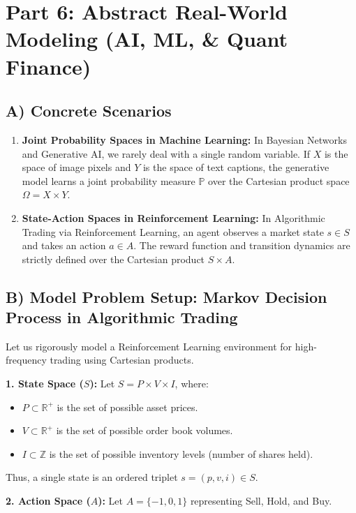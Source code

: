 \documentclass[11pt]{article}
\newcommand{\R}{\mathbb{R}}
\newcommand{\Z}{\mathbb{Z}}
\begin{document}
\section{Part 6: Abstract Real-World Modeling (AI, ML, \& Quant Finance)}

\subsection{A) Concrete Scenarios}
\begin{enumerate}
    \item \textbf{Joint Probability Spaces in Machine Learning:} In Bayesian Networks and Generative AI, we rarely deal with a single random variable. If $X$ is the space of image pixels and $Y$ is the space of text captions, the generative model learns a joint probability measure $\mathbb{P}$ over the Cartesian product space $\Omega = X \times Y$.
    \item \textbf{State-Action Spaces in Reinforcement Learning:} In Algorithmic Trading via Reinforcement Learning, an agent observes a market state $s \in S$ and takes an action $a \in A$. The reward function and transition dynamics are strictly defined over the Cartesian product $S \times A$.
\end{enumerate}

\subsection{B) Model Problem Setup: Markov Decision Process in Algorithmic Trading}
Let us rigorously model a Reinforcement Learning environment for high-frequency trading using Cartesian products.

\textbf{1. State Space ($S$):} Let $S = P \times V \times I$, where:
\begin{itemize}
    \item $P \subset \R^+$ is the set of possible asset prices.
    \item $V \subset \R^+$ is the set of possible order book volumes.
    \item $I \subset \Z$ is the set of possible inventory levels (number of shares held).
\end{itemize}
Thus, a single state is an ordered triplet $s = (p, v, i) \in S$.

\textbf{2. Action Space ($A$):} Let $A = \{-1, 0, 1\}$ representing Sell, Hold, and Buy.
\end{document}

